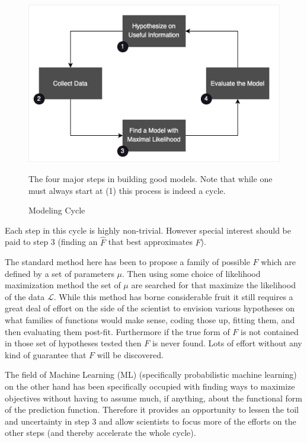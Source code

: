 \documentclass[11pt]{article}
\begin{document}
\begin{figure}[h!] 
  \includegraphics[width=\linewidth]{model_cycle.png}
  \caption{Modeling Cycle}
  \medskip
	\small
	The four major steps in building good models. Note that while one must always start at (1) this process is indeed a cycle.
  \label{fig:model_cycle}
\end{figure}

Each step in this cycle is highly non-trivial. However special interest should be paid to step 3 (finding an $\hat{F}$ that best approximates $F$). 

The standard method here has been to propose a family of possible $F$ which are defined by a set of parameters $\mu$. Then using some choice of likelihood maximization method the set of $\mu$ are searched for that maximize the likelihood of the data $\mathcal{L}$. While this method has borne considerable fruit it still requires a great deal of effort on the side of the scientist to envision various hypotheses on what families of functions would make sense, coding those up, fitting them, and then evaluating them post-fit. Furthermore if the true form of $F$ is not contained in those set of hypotheses tested then $F$ is never found. Lots of effort without any kind of guarantee that $F$ will be discovered.  

The field of Machine Learning (ML) (specifically probabilistic machine learning) on the other hand has been specifically occupied with finding ways to maximize objectives without having to assume much, if anything, about the functional form of the prediction function. Therefore it provides an opportunity to lessen the toil and uncertainty in step 3 and allow scientists to focus more of the efforts on the other steps (and thereby accelerate the whole cycle).
\end{document}
